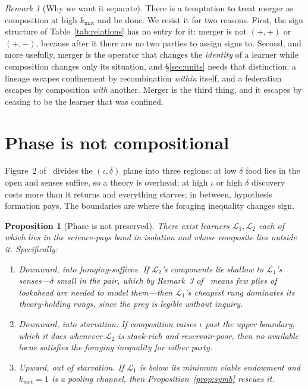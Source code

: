 \documentclass[11pt,a4paper]{article}
\theoremstyle{plain}
\newtheorem{proposition}[theorem]{Proposition}
\theoremstyle{definition}
\theoremstyle{remark}
\newtheorem{remark}[theorem]{Remark}
\newcommand{\Lrn}{\mathcal{L}}
\begin{document}
\begin{remark}[Why we want it separate]
There is a temptation to treat merger as composition at high $k_{\mathrm{mat}}$ and be done. We
resist it for two reasons. First, the sign structure of Table~\ref{tab:relations} has no entry
for it: merger is not $(+,+)$ or $(+,-)$, because after it there are no two parties to assign
signs to. Second, and more usefully, merger is the operator that changes the \emph{identity} of a
learner while composition changes only its situation, and \S\ref{sec:units} needs that
distinction: a lineage escapes confinement by recombination \emph{within} itself, and a
federation escapes by composition \emph{with} another. Merger is the third thing, and it escapes
by ceasing to be the learner that was confined.
\end{remark}

\section{Phase is not compositional}\label{sec:phase}

Figure~2 of~\cite{scientist} divides the $(\iota,\delta)$ plane into three regions: at low $\delta$
food lies in the open and senses suffice, so a theory is overhead; at high $\iota$ or high
$\delta$ discovery costs more than it returns and everything starves; in between, hypothesis
formation pays. The boundaries are where the foraging inequality changes sign.

\begin{proposition}[Phase is not preserved]\label{prop:phase}
There exist learners $\Lrn_1, \Lrn_2$ each of which lies in the science-pays band in isolation
and whose composite lies outside it. Specifically:
\begin{enumerate}[label=(\alph*)]
\item \emph{Downward, into foraging-suffices.} If $\Lrn_2$'s components lie shallow to $\Lrn_1$'s
senses---$\delta$ small in the pair, which by Remark~3 of~\cite{game} means few plies of
lookahead are needed to model them---then $\Lrn_1$'s cheapest rung dominates its theory-holding
rungs, since the prey is legible without inquiry.
\item \emph{Downward, into starvation.} If composition raises $\iota$ past the upper boundary,
which it does whenever $\Lrn_2$ is stack-rich and reservoir-poor, then no available locus
satisfies the foraging inequality for either party.
\item \emph{Upward, out of starvation.} If $\Lrn_1$ is below its minimum viable endowment and
$k_{\mathrm{met}}=1$ is a pooling channel, then Proposition~\ref{prop:symb} rescues it.
\end{enumerate}
\end{proposition}
\end{document}
